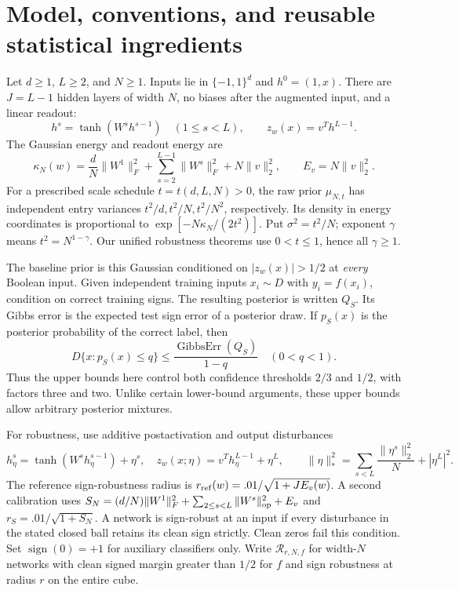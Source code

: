 \documentclass[11pt]{article}
\newcommand{\X}{\{-1,1\}^d}
\begin{document}
\section{Model, conventions, and reusable statistical ingredients}
\label{sec:model}

Let $d\ge1$, $L\ge2$, and $N\ge1$. Inputs lie in $\X$ and
$h^0=(1,x)$. There are $J=L-1$ hidden layers of width $N$, no biases after
the augmented input, and a linear readout:
\[
 h^s=\tanh(W^sh^{s-1})\quad(1\le s<L),\qquad z_w(x)=v^Th^{L-1}.
\]
The Gaussian energy and readout energy are
\[
 \kappa_N(w)=\frac dN\|W^1\|_F^2+
       \sum_{s=2}^{L-1}\|W^s\|_F^2+N\|v\|_2^2,
 \qquad E_v=N\|v\|_2^2.
\]
For a prescribed scale schedule $t=t(d,L,N)>0$, the raw prior
$\mu_{N,t}$ has independent entry variances
$t^2/d,t^2/N,t^2/N^2$, respectively. Its density in energy coordinates
is proportional to $\exp[-N\kappa_N/(2t^2)]$.
Put $\sigma^2=t^2/N$; exponent $\gamma$ means $t^2=N^{1-\gamma}$.
Our unified robustness theorems use $0<t\le1$, hence all $\gamma\ge1$.

The baseline prior is this Gaussian conditioned on
$|z_w(x)|>1/2$ at \emph{every} Boolean input. Given independent training
inputs $x_i\sim D$ with $y_i=f(x_i)$, condition on correct training signs.
The resulting posterior is written $Q_S$.
Its Gibbs error is the expected test sign error of a posterior draw.
If $p_S(x)$ is the posterior probability of the correct label, then
\[
 D\{x:p_S(x)\le q\}\le
 \frac{\operatorname{GibbsErr}(Q_S)}{1-q}\quad(0<q<1).
\]
Thus the upper bounds here control both confidence thresholds $2/3$ and
$1/2$, with factors three and two. Unlike certain lower-bound arguments,
these upper bounds allow arbitrary posterior mixtures.

For robustness, use additive postactivation and output disturbances
\[
 h^s_\eta=\tanh(W^sh^{s-1}_\eta)+\eta^s,
 \quad z_w(x;\eta)=v^Th^{L-1}_\eta+\eta^L,
 \qquad
 \|\eta\|_*^2=\sum_{s<L}\frac{\|\eta^s\|_2^2}{N}+|\eta^L|^2.
 \tag{1}\label{eq:noisenorm}
\]
The reference sign-robustness radius is
$r_{\rm ref}(w)=.01/\sqrt{1+JE_v(w)}$.
A second calibration uses
$S_N=(d/N)\|W^1\|_F^2+\sum_{2\le s<L}\|W^s\|_{\rm op}^2+E_v$
and $r_S=.01/\sqrt{1+S_N}$.
A network is sign-robust at an input if every disturbance in the stated
closed ball retains its clean sign strictly. Clean zeros fail this condition.
Set $\operatorname{sign}(0)=+1$ for auxiliary classifiers only.
Write $\mathcal R_{r,N,f}$ for width-$N$ networks with clean signed
margin greater than $1/2$ for $f$ and sign robustness at radius $r$
on the entire cube.
\end{document}
